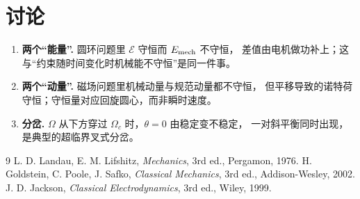 \documentclass[UTF8,a4paper,11pt]{ctexart}
\begin{document}
\section{讨论}

\begin{enumerate}
  \item \textbf{两个“能量”.} 圆环问题里 $\mathcal E$ 守恒而 $E_{\rm mech}$ 不守恒，
        差值由电机做功补上；这与“约束随时间变化时机械能不守恒”是同一件事。
  \item \textbf{两个“动量”.} 磁场问题里机械动量与规范动量都不守恒，
        但平移导致的诺特荷守恒；守恒量对应回旋圆心，而非瞬时速度。
  \item \textbf{分岔.} $\Omega$ 从下方穿过 $\Omega_c$ 时，$\theta=0$ 由稳定变不稳定，
        一对斜平衡同时出现，是典型的超临界叉式分岔。
\end{enumerate}

\begin{thebibliography}{9}
 L. D. Landau, E. M. Lifshitz, \emph{Mechanics}, 3rd ed., Pergamon, 1976.
 H. Goldstein, C. Poole, J. Safko, \emph{Classical Mechanics}, 3rd ed., Addison-Wesley, 2002.
 J. D. Jackson, \emph{Classical Electrodynamics}, 3rd ed., Wiley, 1999.
\end{thebibliography}
\end{document}

